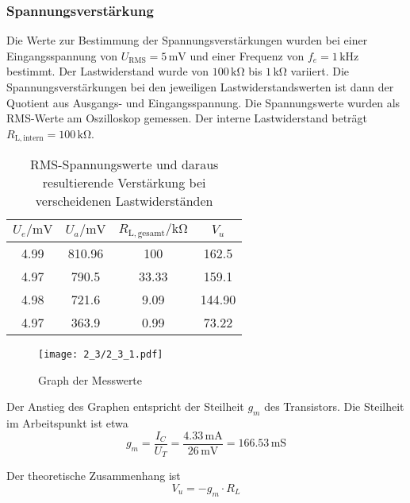 \subsubsection{Spannungsverstärkung}
Die Werte zur Bestimmung der Spannungsverstärkungen wurden bei einer
Eingangsspannung von $U_{\mathrm{RMS}} = 5 \, \si{\milli\volt}$ und einer
Frequenz von $f_e = 1 \, \si{\kilo\hertz}$ bestimmt. Der Lastwiderstand wurde
von $100 \, \si{\kilo\ohm}$ bis $1 \, \si{\kilo\ohm}$ variiert. Die
Spannungsverstärkungen bei den jeweiligen Lastwiderstandswerten ist dann
der Quotient aus Ausgangs- und Eingangsspannung. Die Spannungswerte wurden
als RMS-Werte am Oszilloskop gemessen. Der interne Lastwiderstand beträgt $R_{\mathrm{L,intern}} =
100 \, \si{\kilo\ohm}$.

\begin{table}[H]
  \begin{center}
    \begin{tabular}{|c|c|c|c|}
      \hline
      $U_e / \si{\milli\volt}$ & $U_a / \si{\milli\volt}$ & $R_{\mathrm{L,gesamt}} / \si{\kilo\ohm}$ & $V_u$\\
      \hline
      \hline

      4.99 & 810.96 & 100 & 162.5\\
      4.97 & 790.5 & 33.33 & 159.1\\
      4.98 & 721.6 & 9.09 & 144.90\\
      4.97 & 363.9 & 0.99 & 73.22\\
      \hline
    \end{tabular}

  \end{center}

  \caption{RMS-Spannungswerte und daraus resultierende Verstärkung bei
    verscheidenen Lastwiderständen}

\end{table}

\begin{figure}[H]
  \begin{center}
    \texttt{[image: 2\_3/2\_3\_1.pdf]}
  \end{center}
  \caption{Graph der Messwerte}
\end{figure}

Der Anstieg des Graphen entspricht der Steilheit $g_m$ des Transistors. Die
Steilheit im Arbeitspunkt ist etwa
\[g_m = \frac{I_C}{U_T} = \frac{4.33 \, \si{\milli\ampere}}{26 \,
    \si{\milli\volt}} = 166.53 \, \si{\milli\siemens}\]

Der theoretische Zusammenhang ist
\[V_u = - g_m \cdot R_L \] 

